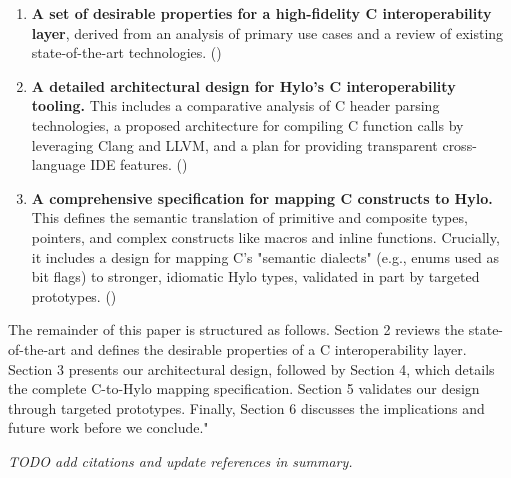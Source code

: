 \begin{enumerate}
    \item \textbf{A set of desirable properties for a high-fidelity C interoperability layer}, derived from an analysis of primary use cases and a review of existing state-of-the-art technologies. ()   
    \item \textbf{A detailed architectural design for Hylo's C interoperability tooling.} This includes a comparative analysis of C header parsing technologies, a proposed architecture for compiling C function calls by leveraging Clang and LLVM, and a plan for providing transparent cross-language IDE features. ()
    \item \textbf{A comprehensive specification for mapping C constructs to Hylo.} This defines the semantic translation of primitive and composite types, pointers, and complex constructs like macros and inline functions. Crucially, it includes a design for mapping C's "semantic dialects" (e.g., enums used as bit flags) to stronger, idiomatic Hylo types, validated in part by targeted prototypes. ()
\end{enumerate}

The remainder of this paper is structured as follows. Section 2 reviews the state-of-the-art and defines the desirable properties of a C interoperability layer. Section 3 presents our architectural design, followed by Section 4, which details the complete C-to-Hylo mapping specification. Section 5 validates our design through targeted prototypes. Finally, Section 6 discusses the implications and future work before we conclude."

\textit{TODO add citations and update references in summary.} 
    
    
    
    
